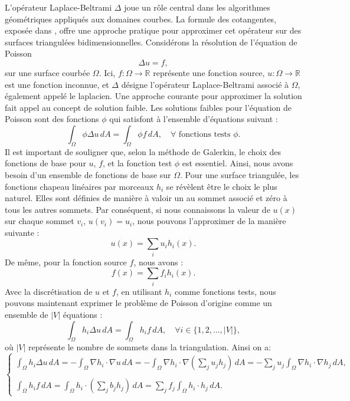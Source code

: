 L'opérateur Laplace-Beltrami $\Delta$ joue un rôle central dans les algorithmes géométriques appliqués aux domaines courbes. La formule des cotangentes, exposée dans \cite{operatorlecture, crane2019n}, offre une approche pratique pour approximer cet opérateur sur des surfaces triangulées bidimensionnelles. Considérons la résolution de l'équation de Poisson
\[ \Delta u = f, \]
sur une surface courbée $\Omega$. Ici, $f : \Omega \rightarrow \mathbb{R}$ représente une fonction source, $u : \Omega \rightarrow \mathbb{R}$ est une fonction inconnue, et $\Delta$ désigne l'opérateur Laplace-Beltrami associé à $\Omega$, également appelé le laplacien. Une approche courante pour approximer la solution fait appel au concept de solution faible. Les solutions faibles pour l'équation de Poisson sont des fonctions $\phi$ qui satisfont à l'ensemble d'équations suivant :
\[ \int_{\Omega} \phi \Delta u \,dA = \int_{\Omega} \phi f \,dA, \quad \forall \text{ fonctions tests } \phi .\]
Il est important de souligner que, selon la méthode de Galerkin, le choix des fonctions de base pour $u$, $f$, et la fonction test $\phi$ est essentiel. Ainsi, nous avons besoin d'un ensemble de fonctions de base sur $\Omega$. Pour une surface triangulée, les fonctions chapeau linéaires par morceaux $h_i$ se révèlent être le choix le plus naturel. Elles sont définies de manière à valoir un au sommet associé et zéro à tous les autres sommets. Par conséquent, si nous connaissons la valeur de $u(x)$ sur chaque sommet $v_i$, $u(v_i) = u_i$, nous pouvons l'approximer de la manière suivante :
\[ u(x) = \sum_{i} u_ih_i(x) .\]
De même, pour la fonction source $f$, nous avons :
\[ f(x) = \sum_{i} f_ih_i(x). \]
Avec la discrétisation de $u$ et $f$, en utilisant $h_i$ comme fonctions tests, nous pouvons maintenant exprimer le problème de Poisson d'origine comme un ensemble de $|V|$ équations :
\[ \int_{\Omega} h_i\Delta u \,dA = \int_{\Omega} h_if \,dA, \quad \forall i \in \{1, 2, . . . , |V|\},\]
où $|V|$ représente le nombre de sommets dans la triangulation.
 Ainsi on a:
\begin{equation}
\left\{
\begin{array}{l}
    \displaystyle\int_{\Omega} h_i\Delta u \,dA = - \int_{\Omega} \nabla h_i \cdot \nabla u \,dA = - \int_{\Omega} \nabla h_i \cdot \nabla \left(\sum_{j} u_j h_j\right) \,dA = - \sum_{j} u_j \int_{\Omega} \nabla h_i \cdot \nabla h_j \,dA,\\\\
    \displaystyle\int_{\Omega} h_if \,dA = \int_{\Omega} h_i \cdot \left(\sum_{j} b_j h_j\right) \,dA = \sum_{j} f_j \int_{\Omega} h_i \cdot h_j \,dA.
\end{array}
\right.
\end{equation}
